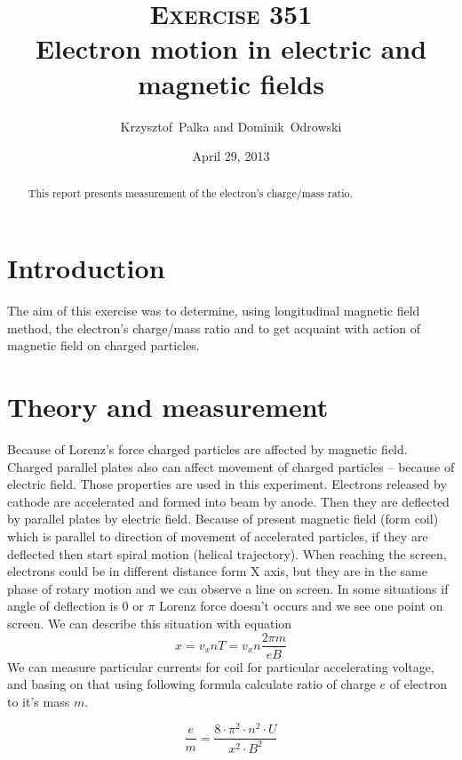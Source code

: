 \documentclass[a4paper,12pt]{article}
\author{Krzysztof~Palka and Dominik~Odrowski}
\date{April 29, 2013}
\title{\textsc{Exercise} 351 \\
Electron motion in electric and magnetic fields}
\begin{document}
    \maketitle

    \begin{abstract}
        This report presents measurement of the electron's charge/mass ratio.
    \end{abstract}

    \section{Introduction}
    The aim of this exercise was to determine, using longitudinal magnetic field method, the electron's charge/mass ratio and to get acquaint with action of magnetic field on charged particles. 

    \section{Theory and measurement}

    Because of Lorenz's force charged particles are affected by magnetic field. Charged parallel plates also can affect movement of charged particles -- because of electric field. Those properties are used in this experiment. Electrons released by cathode are accelerated and formed into beam by anode. Then they are deflected by parallel plates by electric field. Because of present magnetic field (form coil) which is parallel to direction of movement of accelerated particles, if they are deflected then start spiral motion (helical trajectory). When reaching the screen, electrons could be in different distance form X axis, but they are in the same phase of rotary motion and we can observe a line on screen. In some situations if angle of deflection is 0 or $\pi$ Lorenz force doesn't occurs and we see one point on screen.
    We can describe this situation with equation 
    \begin{equation}
        x = v_x nT = v_x n \frac{2 \pi m}{e B}
    \end{equation}
    We can measure particular currents for coil for particular accelerating voltage, and basing on that using following formula calculate ratio of charge $e$ of electron to it's mass $m$.    

    \begin{equation}
        \frac{e}{m} = \frac{8 \cdot \pi^2 \cdot n^2 \cdot U}{x^2 \cdot B^2} \label{eq:general}
    \end{equation}
    
\end{document}
